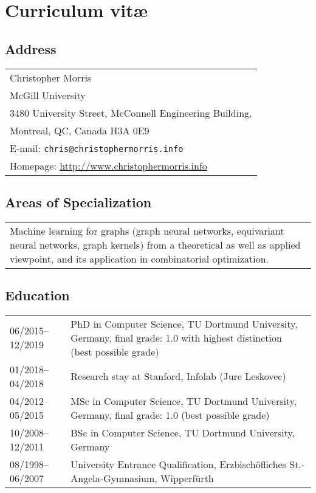 \documentclass[11pt, a4paper, DIV=12]{scrartcl}
\begin{document}
\section*{\textcolor{upmaroon}{Curriculum vitæ}}
\vspace{-20pt}
\hrulefill
\subsection*{Address}
\noindent
\begin{tabular}{l}
Christopher Morris\\
McGill University\\ 
3480 University Street, McConnell Engineering Building,\\ 
Montreal, QC, Canada H3A 0E9\\
E-mail: \texttt{chris@christophermorris.info} \\
Homepage: \url{http://www.christophermorris.info}\\
\end{tabular}

\subsection*{Areas of Specialization}
\noindent
\begin{tabular}{p{15.0cm}}
Machine learning for graphs (graph neural networks, equivariant neural networks, graph kernels) from a theoretical as well as applied viewpoint, and its application in combinatorial optimization. 
\end{tabular}

\subsection*{Education}
\noindent
\begin{tabular}{p{3.0cm}p{11.5cm}}
	06/2015--12/2019&PhD in Computer Science, TU Dortmund University, Germany, final grade: 1.0 with highest distinction  (best possible grade)\\
	01/2018--04/2018& Research stay at Stanford, Infolab (Jure Leskovec)\\
	04/2012--05/2015&MSc in Computer Science, TU Dortmund University, Germany, final grade: 1.0 (best possible grade)\\
	10/2008--12/2011&BSc in Computer Science, TU Dortmund University, Germany\\
	08/1998--06/2007&University Entrance Qualification, Erzbisch\"ofliches St.-Angela-Gymnasium, Wipperf\"urth\\
\end{tabular}
\end{document}
